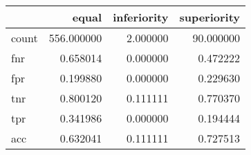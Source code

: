 \begin{tabular}{lrrr}
\toprule
{} &       equal &  inferiority &  superiority \\
\midrule
count &  556.000000 &     2.000000 &    90.000000 \\
fnr   &    0.658014 &     0.000000 &     0.472222 \\
fpr   &    0.199880 &     0.000000 &     0.229630 \\
tnr   &    0.800120 &     0.111111 &     0.770370 \\
tpr   &    0.341986 &     0.000000 &     0.194444 \\
acc   &    0.632041 &     0.111111 &     0.727513 \\
\bottomrule
\end{tabular}
